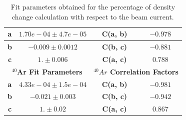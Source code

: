 \documentclass[final,5p,times,twocolumn]{elsarticle}
\begin{document}
\begin{table}[!h]
\begin{tabular}{|c|c|l|c|c|l|}
\textbf{a}              & \multicolumn{2}{c|}{$1.70e-04 \pm 4.7e-05$}                & \textbf{C(a, b)}             & \multicolumn{2}{c|}{$-0.978$} \\ \hline
\textbf{b}              & \multicolumn{2}{c|}{$-0.009 \pm 0.0012$}                   & \textbf{C(b, c)}             & \multicolumn{2}{c|}{$-0.881$} \\ \hline
\textbf{c}              & \multicolumn{2}{c|}{$1. \pm 0.006$}                        & \textbf{C(a, c)}             & \multicolumn{2}{c|}{$0.788$}  \\ \hline
\multicolumn{3}{|c|}{\textbf{$^{40}$Ar Fit Parameters}}                              & \multicolumn{3}{c|}{\textbf{$^{40}Ar$ Correlation Factors}}  \\ \hline
\textbf{a}              & \multicolumn{2}{c|}{$4.33 e-04 \pm 1.5e-04$}               & \textbf{C(a, b)}             & \multicolumn{2}{c|}{$-0.981$} \\ \hline
\textbf{b}              & \multicolumn{2}{c|}{$-0.021 \pm 0.003$}                    & \textbf{C(b, c)}             & \multicolumn{2}{c|}{$-0.942$} \\ \hline
\textbf{c}              & \multicolumn{2}{c|}{$1. \pm 0.02$}                         & \textbf{C(a, c)}             & \multicolumn{2}{c|}{$0.867$}  \\ \hline
\end{tabular}
\caption{Fit parameters obtained for the percentage of density change calculation with respect to the beam current.}
\label{tab:fit_parameters}
\end{table}
\end{document}
